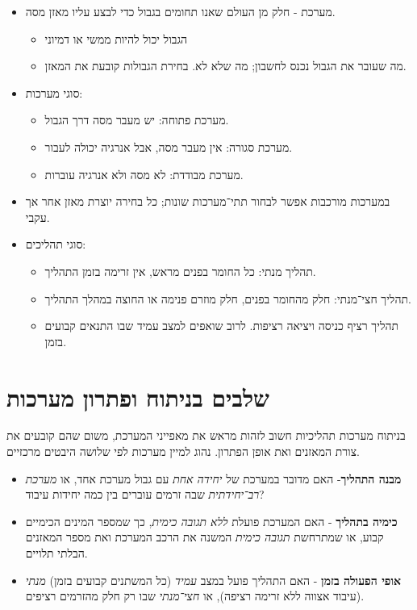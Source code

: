 \documentclass[
  hebrew,
  letterpaper,
  DIV=11,
  numbers=noendperiod]{scrreprt}
\begin{document}
\begin{itemize}
\item
  מערכת - חלק מן העולם שאנו תחומים בגבול כדי לבצע עליו מאזן מסה.

  \begin{itemize}
  \item
    הגבול יכול להיות ממשי או דמיוני
  \item
    מה שעובר את הגבול נכנס לחשבון; מה שלא לא. בחירת הגבולות קובעת את
    המאזן.
  \end{itemize}
\item
  סוגי מערכות:

  \begin{itemize}
  \item
    מערכת פתוחה: יש מעבר מסה דרך הגבול.
  \item
    מערכת סגורה: אין מעבר מסה, אבל אנרגיה יכולה לעבור.
  \item
    מערכת מבודדת: לא מסה ולא אנרגיה עוברות.
  \end{itemize}
\item
  במערכות מורכבות אפשר לבחור תתי־מערכות שונות; כל בחירה יוצרת מאזן אחר
  אך עקבי.
\item
  סוגי תהליכים:

  \begin{itemize}
  \item
    תהליך מנתי: כל החומר בפנים מראש, אין זרימה בזמן התהליך.
  \item
    תהליך חצי־מנתי: חלק מהחומר בפנים, חלק מוזרם פנימה או החוצה במהלך
    התהליך.
  \item
    תהליך רציף כניסה ויציאה רציפות. לרוב שואפים למצב עמיד שבו התנאים
    קבועים בזמן.
  \end{itemize}
\end{itemize}

\section{שלבים בניתוח ופתרון
מערכות}\label{ux5e9ux5dcux5d1ux5d9ux5dd-ux5d1ux5e0ux5d9ux5eaux5d5ux5d7-ux5d5ux5e4ux5eaux5e8ux5d5ux5df-ux5deux5e2ux5e8ux5dbux5d5ux5ea}

בניתוח מערכות תהליכיות חשוב לזהות מראש את מאפייני המערכת, משום שהם
קובעים את צורת המאזנים ואת אופן הפתרון. נהוג למיין מערכות לפי שלושה
היבטים מרכזיים.

\begin{itemize}
\item
  \textbf{מבנה התהליך}- האם מדובר במערכת של \emph{יחידה אחת} עם גבול
  מערכת אחד, או \emph{מערכת רב־יחידתית} שבה זרמים עוברים בין כמה יחידות
  עיבוד?
\item
  \textbf{כימיה בתהליך} - האם המערכת פועלת \emph{ללא תגובה כימית}, כך
  שמספר המינים הכימיים קבוע, או שמתרחשת \emph{תגובה כימית} המשנה את הרכב
  המערכת ואת מספר המאזנים הבלתי תלויים.
\item
  \textbf{אופי הפעולה בזמן} - האם התהליך פועל במצב \emph{עמיד} (כל
  המשתנים קבועים בזמן) \emph{מנתי} (עיבוד אצווה ללא זרימה רציפה), או
  \emph{חצי־מנתי} שבו רק חלק מהזרמים רציפים.
\end{itemize}
\end{document}
